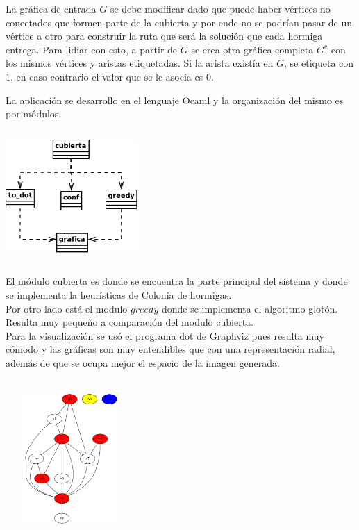 \documentclass[oneside,12pt]{article}
\begin{document}
La gráfica de entrada $G$ se debe modificar dado que puede haber vértices no conectados que formen parte de la cubierta y por ende no se podrían pasar de un vértice a otro para construir la ruta que será la solución que cada hormiga entrega. Para lidiar con esto, a partir de $G$ se crea otra gráfica completa $G^{c}$ con los mismos vértices y aristas etiquetadas. Si la arista existía en $G$, se etiqueta con $1$, en caso contrario el valor que se le asocia es $0$.

La aplicación se desarrollo en el lenguaje Ocaml y la organización del mismo es por módulos.\\

\begin{center}
\includegraphics[width=5cm, height=5cm]{diagrama}
\end{center}

El módulo cubierta es donde se encuentra la parte principal del sistema y donde se implementa la heurísticas de Colonia de hormigas.\\
Por otro lado está el modulo $greedy$ donde se implementa el algoritmo glotón. Resulta muy pequeño a comparación del modulo cubierta.\\
Para la visualización se usó el programa dot de Graphviz pues resulta muy cómodo y las gráficas son muy entendibles que con una representación radial, además de que se ocupa mejor el espacio de la imagen generada.\\\\

\begin{center}
\includegraphics[width=5cm, height=5cm]{grafica_ejemplo}
\end{center}
\end{document}

